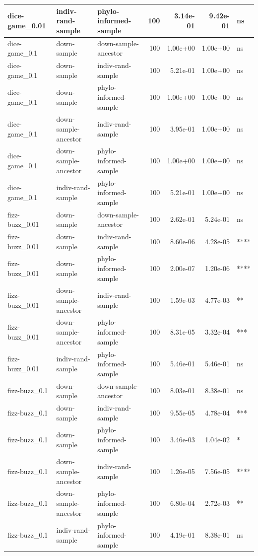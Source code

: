 \documentclass[
]{book}
\begin{document}
\begin{table}
\begin{tabular}[t]{l|l|l|r|r|r|l}
\hline
dice-game\_0.01 & indiv-rand-sample & phylo-informed-sample & 100 & 3.14e-01 & 9.42e-01 & ns\\
\hline
dice-game\_0.1 & down-sample & down-sample-ancestor & 100 & 1.00e+00 & 1.00e+00 & ns\\
\hline
dice-game\_0.1 & down-sample & indiv-rand-sample & 100 & 5.21e-01 & 1.00e+00 & ns\\
\hline
dice-game\_0.1 & down-sample & phylo-informed-sample & 100 & 1.00e+00 & 1.00e+00 & ns\\
\hline
dice-game\_0.1 & down-sample-ancestor & indiv-rand-sample & 100 & 3.95e-01 & 1.00e+00 & ns\\
\hline
dice-game\_0.1 & down-sample-ancestor & phylo-informed-sample & 100 & 1.00e+00 & 1.00e+00 & ns\\
\hline
dice-game\_0.1 & indiv-rand-sample & phylo-informed-sample & 100 & 5.21e-01 & 1.00e+00 & ns\\
\hline
fizz-buzz\_0.01 & down-sample & down-sample-ancestor & 100 & 2.62e-01 & 5.24e-01 & ns\\
\hline
fizz-buzz\_0.01 & down-sample & indiv-rand-sample & 100 & 8.60e-06 & 4.28e-05 & ****\\
\hline
fizz-buzz\_0.01 & down-sample & phylo-informed-sample & 100 & 2.00e-07 & 1.20e-06 & ****\\
\hline
fizz-buzz\_0.01 & down-sample-ancestor & indiv-rand-sample & 100 & 1.59e-03 & 4.77e-03 & **\\
\hline
fizz-buzz\_0.01 & down-sample-ancestor & phylo-informed-sample & 100 & 8.31e-05 & 3.32e-04 & ***\\
\hline
fizz-buzz\_0.01 & indiv-rand-sample & phylo-informed-sample & 100 & 5.46e-01 & 5.46e-01 & ns\\
\hline
fizz-buzz\_0.1 & down-sample & down-sample-ancestor & 100 & 8.03e-01 & 8.38e-01 & ns\\
\hline
fizz-buzz\_0.1 & down-sample & indiv-rand-sample & 100 & 9.55e-05 & 4.78e-04 & ***\\
\hline
fizz-buzz\_0.1 & down-sample & phylo-informed-sample & 100 & 3.46e-03 & 1.04e-02 & *\\
\hline
fizz-buzz\_0.1 & down-sample-ancestor & indiv-rand-sample & 100 & 1.26e-05 & 7.56e-05 & ****\\
\hline
fizz-buzz\_0.1 & down-sample-ancestor & phylo-informed-sample & 100 & 6.80e-04 & 2.72e-03 & **\\
\hline
fizz-buzz\_0.1 & indiv-rand-sample & phylo-informed-sample & 100 & 4.19e-01 & 8.38e-01 & ns\\

\end{tabular}
\end{table}
\end{document}
